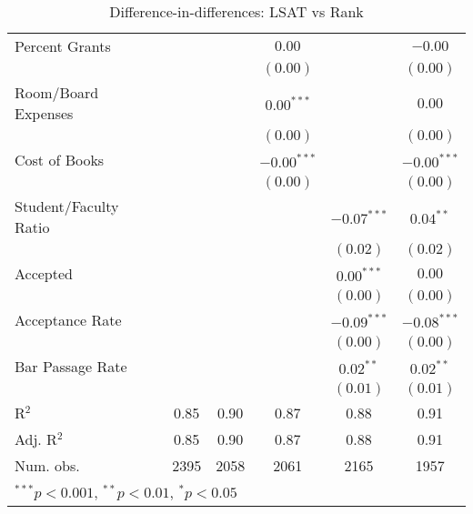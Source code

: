 \begin{table}
\begin{center}
\begin{tabular}{l c c c c c }
Percent Grants        &                &                & $0.00$         &                & $-0.00$        \\
                      &                &                & $(0.00)$       &                & $(0.00)$       \\
Room/Board Expenses   &                &                & $0.00^{***}$   &                & $0.00$         \\
                      &                &                & $(0.00)$       &                & $(0.00)$       \\
Cost of Books         &                &                & $-0.00^{***}$  &                & $-0.00^{***}$  \\
                      &                &                & $(0.00)$       &                & $(0.00)$       \\
Student/Faculty Ratio &                &                &                & $-0.07^{***}$  & $0.04^{**}$    \\
                      &                &                &                & $(0.02)$       & $(0.02)$       \\
Accepted              &                &                &                & $0.00^{***}$   & $0.00$         \\
                      &                &                &                & $(0.00)$       & $(0.00)$       \\
Acceptance Rate       &                &                &                & $-0.09^{***}$  & $-0.08^{***}$  \\
                      &                &                &                & $(0.00)$       & $(0.00)$       \\
Bar Passage Rate      &                &                &                & $0.02^{**}$    & $0.02^{**}$    \\
                      &                &                &                & $(0.01)$       & $(0.01)$       \\
\hline
R$^2$                 & 0.85           & 0.90           & 0.87           & 0.88           & 0.91           \\
Adj. R$^2$            & 0.85           & 0.90           & 0.87           & 0.88           & 0.91           \\
Num. obs.             & 2395           & 2058           & 2061           & 2165           & 1957           \\
\hline
\multicolumn{6}{l}{\scriptsize{$^{***}p<0.001$, $^{**}p<0.01$, $^*p<0.05$}}
\end{tabular}
\caption{Difference-in-differences: LSAT vs Rank}
\label{tab:lsat-rank}
\end{center}
\end{table}
